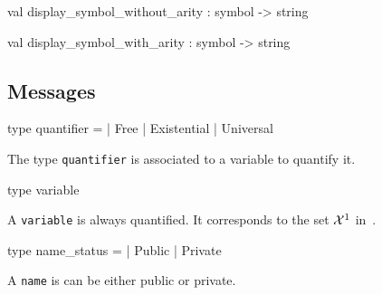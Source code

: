\label{val:Term.display-underscoresymbol-underscorewithout-underscorearity}\begin{ocamldoccode}
val display_symbol_without_arity : symbol -> string
\end{ocamldoccode}




\label{val:Term.display-underscoresymbol-underscorewith-underscorearity}\begin{ocamldoccode}
val display_symbol_with_arity : symbol -> string
\end{ocamldoccode}




\subsection{Messages}




\label{type:Term.quantifier}\begin{ocamldoccode}
type quantifier =
  | Free
  | Existential
  | Universal
\end{ocamldoccode}
\begin{ocamldocdescription}
The type {\tt{quantifier}} is associated to a variable to quantify it.


\end{ocamldocdescription}




\label{type:Term.variable}\begin{ocamldoccode}
type variable 
\end{ocamldoccode}
\begin{ocamldocdescription}
A {\tt{variable}} is always quantified. It corresponds to the set $\mathcal{X}^1$ in~\thesis. 


\end{ocamldocdescription}




\label{type:Term.name-underscorestatus}\begin{ocamldoccode}
type name_status =
  | Public
  | Private
\end{ocamldoccode}
\begin{ocamldocdescription}
A {\tt{name}} is can be either public or private.


\end{ocamldocdescription}




